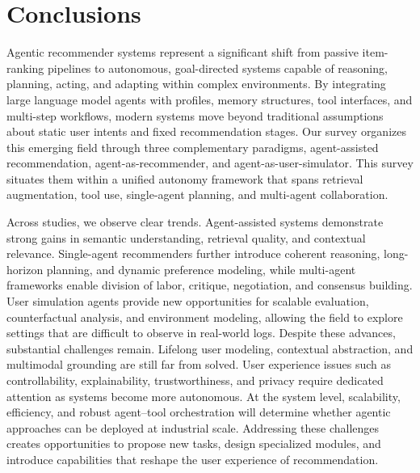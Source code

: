 \section{Conclusions}
Agentic recommender systems represent a significant shift from passive item-ranking pipelines to autonomous, goal-directed systems capable of reasoning, planning, acting, and adapting within complex environments. 
By integrating large language model agents with profiles, memory structures, tool interfaces, and multi-step workflows, modern systems move beyond traditional assumptions about static user intents and fixed recommendation stages. Our survey organizes this emerging field through three complementary paradigms, \ie agent-assisted recommendation, agent-as-recommender, and agent-as-user-simulator. This survey situates them within a unified autonomy framework that spans retrieval augmentation, tool use, single-agent planning, and multi-agent collaboration.

Across studies, we observe clear trends. Agent-assisted systems demonstrate strong gains in semantic understanding, retrieval quality, and contextual relevance. Single-agent recommenders further introduce coherent reasoning, long-horizon planning, and dynamic preference modeling, while multi-agent frameworks enable division of labor, critique, negotiation, and consensus building. User simulation agents provide new opportunities for scalable evaluation, counterfactual analysis, and environment modeling, allowing the field to explore settings that are difficult to observe in real-world logs. 
Despite these advances, substantial challenges remain. Lifelong user modeling, contextual abstraction, and multimodal grounding are still far from solved. User experience issues such as controllability, explainability, trustworthiness, and privacy require dedicated attention as systems become more autonomous. At the system level, scalability, efficiency, and robust agent–tool orchestration will determine whether agentic approaches can be deployed at industrial scale. Addressing these challenges creates opportunities to propose new tasks, design specialized modules, and introduce capabilities that reshape the user experience of recommendation.